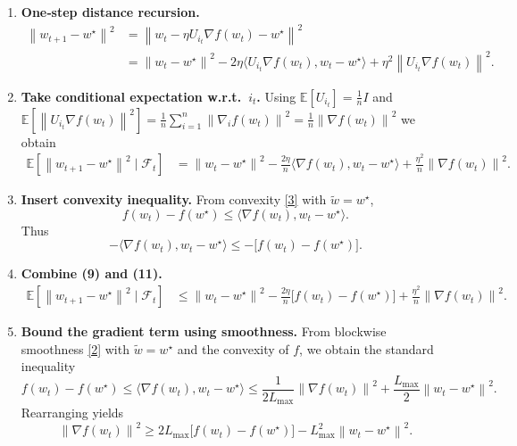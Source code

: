 \documentclass[11pt]{article}
\newcommand{\E}{\mathbb{E}}
\newcommand{\norm}[1]{\left\|#1\right\|}
\newcommand{\inner}[2]{\langle #1,#2\rangle}
\begin{document}
\begin{enumerate}
\item[Step 1.] \textbf{One‑step distance recursion.}
\[
\begin{aligned}
\norm{w_{t+1}-w^{\star}}^{2}
&= \norm{w_{t}-\eta U_{i_{t}}\nabla f(w_{t})-w^{\star}}^{2}\\
&= \norm{w_{t}-w^{\star}}^{2}
   -2\eta\inner{U_{i_{t}}\nabla f(w_{t})}{w_{t}-w^{\star}}
   +\eta^{2}\norm{U_{i_{t}}\nabla f(w_{t})}^{2}.
\end{aligned}
\tag{8}
\]

\item[Step 2.] \textbf{Take conditional expectation w.r.t.\ $i_{t}$.}
Using $\E[U_{i_{t}}]=\frac{1}{n}I$ and $\E[\norm{U_{i_{t}}\nabla f(w_{t})}^{2}]
   =\frac{1}{n}\sum_{i=1}^{n}\norm{\nabla_{i}f(w_{t})}^{2}
   =\frac{1}{n}\norm{\nabla f(w_{t})}^{2}$ we obtain
\[
\begin{aligned}
\E\!\left[\norm{w_{t+1}-w^{\star}}^{2}\mid\mathcal{F}_{t}\right]
&= \norm{w_{t}-w^{\star}}^{2}
   -\frac{2\eta}{n}\inner{\nabla f(w_{t})}{w_{t}-w^{\star}}
   +\frac{\eta^{2}}{n}\norm{\nabla f(w_{t})}^{2}.
\end{aligned}
\tag{9}
\]

\item[Step 3.] \textbf{Insert convexity inequality.}  
From convexity \eqref{3} with $\tilde w=w^{\star}$,
\[
f(w_{t})-f(w^{\star})\le\inner{\nabla f(w_{t})}{w_{t}-w^{\star}}.
\tag{10}
\]
Thus
\[
-\inner{\nabla f(w_{t})}{w_{t}-w^{\star}}
\le -\bigl[f(w_{t})-f(w^{\star})\bigr].
\tag{11}
\]

\item[Step 4.] \textbf{Combine (9) and (11).}
\[
\begin{aligned}
\E\!\left[\norm{w_{t+1}-w^{\star}}^{2}\mid\mathcal{F}_{t}\right]
&\le \norm{w_{t}-w^{\star}}^{2}
   -\frac{2\eta}{n}\bigl[f(w_{t})-f(w^{\star})\bigr]
   +\frac{\eta^{2}}{n}\norm{\nabla f(w_{t})}^{2}.
\end{aligned}
\tag{12}
\]

\item[Step 5.] \textbf{Bound the gradient term using smoothness.}  
From blockwise smoothness \eqref{2} with $\tilde w=w^{\star}$ and the convexity of
$f$, we obtain the standard inequality
\[
f(w_{t})-f(w^{\star})\le \inner{\nabla f(w_{t})}{w_{t}-w^{\star}}
   \le \frac{1}{2L_{\max}}\norm{\nabla f(w_{t})}^{2}
      +\frac{L_{\max}}{2}\norm{w_{t}-w^{\star}}^{2}.
\tag{13}
\]
Rearranging yields
\[
\norm{\nabla f(w_{t})}^{2}\ge 2L_{\max}\bigl[f(w_{t})-f(w^{\star})\bigr]
      -L_{\max}^{2}\norm{w_{t}-w^{\star}}^{2}.
\tag{14}
\]


\end{enumerate}
\end{document}
